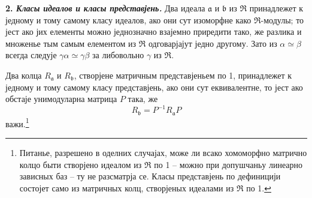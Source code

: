 \documentclass[11pt]{article}
\begin{document}
\setcounter{footnote}{24}

\textbf{2. \emph{Класы идеалов и класы представјень.}} Два идеала $\mathfrak a$ и $\mathfrak b$ из $\mathfrak R$ принадлежет к једному и тому самому класу идеалов, ако они сут изоморфне како $\mathfrak R$-модулы; то јест ако јих елементы можно једнозначно взајемно приредити тако, же разлика и множенье тым самым елементом из $\mathfrak R$ одговарјајут једно другому. Зато из $\alpha\simeq\beta$ всегда следује $\gamma\alpha\simeq\gamma\beta$ за либовольно $\gamma$ из $\mathfrak R$.

Два колца $R_\mathfrak a$ и $R_\mathfrak b$, створјене матричным представјеньем по 1, принадлежет к једному и тому самому класу представјень, ако они сут еквивалентне, то јест ако обстаје унимодуларна матрица $P$ така, же
\[
        R_\mathfrak b=P^{-1}R_\mathfrak a P
\]
важи.\footnote{Питанье, разрешено в оделних случајах, може ли всако хомоморфно матрично колцо быти створјено идеалом из $\mathfrak R$ по 1 -- можно при допушчаньу линеарно зависных баз -- ту не разсматрја се. Класы представјень по дефиницији состојет само из матричных колц, створјеных идеалами из $\mathfrak R$ по 1.}
\end{document}
